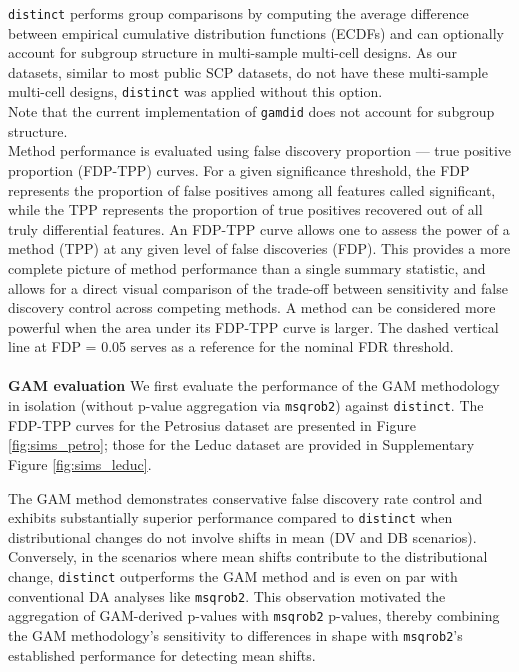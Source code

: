 \texttt{distinct} performs group comparisons by computing the average difference between empirical cumulative distribution functions (ECDFs) and can optionally account for subgroup structure in multi-sample multi-cell designs. As our datasets, similar to most public SCP datasets, do not have these multi-sample multi-cell designs, \texttt{distinct} was applied without this option.\\
Note that the current implementation of \texttt{gamdid} does not account for subgroup structure.\\
Method performance is evaluated using false discovery proportion — true positive proportion (FDP-TPP) curves. For a given significance threshold, the FDP represents the proportion of false positives among all features called significant, while the TPP represents the proportion of true positives recovered out of all truly differential features. An FDP-TPP curve allows one to assess the power of a method (TPP) at any given level of false discoveries (FDP). This provides a more complete picture of method performance than a single summary statistic, and allows for a direct visual comparison of the trade-off between sensitivity and false discovery control across competing methods. A method can be considered more powerful when the area under its FDP-TPP curve is larger. The dashed vertical line at FDP = 0.05 serves as a reference for the nominal FDR threshold.
\\
\\
\textbf{GAM evaluation}
We first evaluate the performance of the GAM methodology in isolation (without p-value aggregation via \texttt{msqrob2}) against \texttt{distinct}. The FDP-TPP curves for the Petrosius dataset are presented in Figure \ref{fig:sims_petro}; those for the Leduc dataset are provided in Supplementary Figure \ref{fig:sims_leduc}.

The GAM method demonstrates conservative false discovery rate control and exhibits substantially superior performance compared to \texttt{distinct} when distributional changes do not involve shifts in mean (DV and DB scenarios). Conversely, in the scenarios where mean shifts contribute to the distributional change, \texttt{distinct} outperforms the GAM method and is even on par with conventional DA analyses like \texttt{msqrob2}. This observation motivated the aggregation of GAM-derived p-values with \texttt{msqrob2} p-values, thereby combining the GAM methodology's sensitivity to differences in shape with \texttt{msqrob2}'s established performance for detecting mean shifts.



